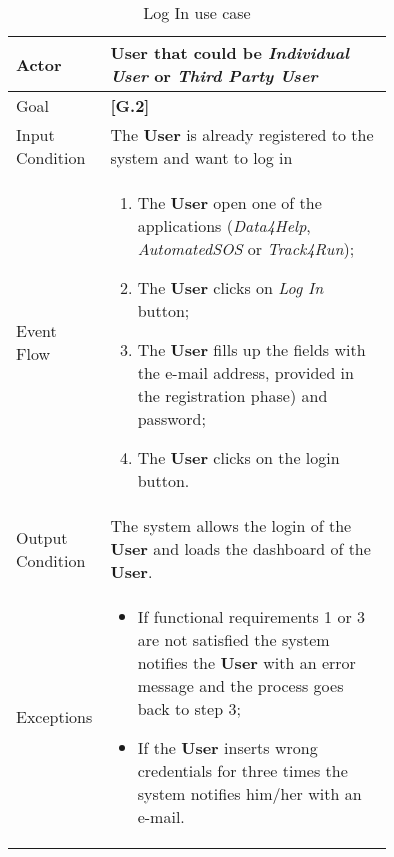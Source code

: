 \begin{center}
\begin{table}
\begin{tabular}{ | l | p{0.75\linewidth} | }
  \hline
    Actor & \textbf{User} that could be \textit{Individual User} or \textit{Third Party User} \\ \hline
    Goal & \textbf{[G.2]} \\ \hline
    Input Condition & The \textbf{User} is already registered to the system and want to log in \\ \hline
    Event Flow & \begin{minipage}[t]{0.7\textwidth}
      \begin{enumerate}
        \item The \textbf{User} open one of the applications (\textit{Data4Help}, \textit{AutomatedSOS} or \textit{Track4Run});
        \item The \textbf{User} clicks on \textit{Log In} button;
        \item The \textbf{User} fills up the fields with the e-mail address, provided in the registration phase) and password;
        \item The \textbf{User} clicks on the login button.
      \end{enumerate}
    \smallskip
  \end{minipage} \\ \hline
  Output Condition & The system allows the login of the \textbf{User} and loads the dashboard of the \textbf{User}. \\ \hline
  Exceptions & \begin{minipage}[t]{0.7\textwidth}
    \begin{itemize}
      \smallskip
      \item If functional requirements 1 or 3 are not satisfied the system notifies the \textbf{User} with an error message and the process goes back to step 3;
      \item If the \textbf{User} inserts wrong credentials for three times the system notifies him/her with an e-mail.
    \end{itemize}
    \smallskip
  \end{minipage}  \\ \hline
\end{tabular}
\caption{Log In use case}
\label{table:logInInTable}
\end{table}
\end{center}
